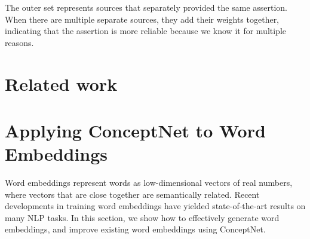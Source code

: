\documentclass[letterpaper]{article}
\begin{document}
The outer set represents sources that separately provided the same
assertion. When there are multiple separate sources, they add their
weights together, indicating that the assertion is more reliable because
we know it for multiple reasons.





\section{Related work}


\section{Applying ConceptNet to Word Embeddings}
\label{applying-conceptnet-to-word-embeddings}

Word embeddings represent words as low-dimensional vectors of real numbers,
where vectors that are close together are semantically related. Recent
developments in training word embeddings have yielded state-of-the-art results
on many NLP tasks. In this section, we show how to effectively generate
word embeddings, and improve existing word embeddings using ConceptNet.
\end{document}
